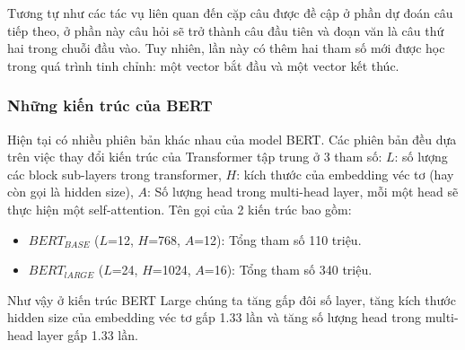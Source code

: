 Tương tự như các tác vụ liên quan đến cặp câu được đề cập ở phần dự đoán câu tiếp theo, ở phần này câu hỏi sẽ trở thành câu đầu tiên và đoạn văn là câu thứ hai trong chuỗi đầu vào. Tuy nhiên, lần này có thêm hai tham số mới được học trong quá trình tinh chỉnh: một vector bắt đầu và một vector kết thúc.

\subsubsection{Những kiến trúc của BERT}
Hiện tại có nhiều phiên bản khác nhau của model BERT. Các phiên bản đều dựa trên việc thay đổi kiến trúc của Transformer tập trung ở 3 tham số: $L$: số lượng các block sub-layers trong transformer, $H$: kích thước của embedding véc tơ (hay còn gọi là hidden size), $A$: Số lượng head trong multi-head layer, mỗi một head sẽ thực hiện một self-attention. Tên gọi của 2 kiến trúc bao gồm:
\begin{itemize}
    \item $BERT_{BASE}$ ($L$=12, $H$=768, $A$=12): Tổng tham số 110 triệu.
    \item $BERT_{lARGE}$ ($L$=24, $H$=1024, $A$=16): Tổng tham số 340 triệu.
\end{itemize}
Như vậy ở kiến trúc BERT Large chúng ta tăng gấp đôi số layer, tăng kích thước hidden size của embedding véc tơ gấp 1.33 lần và tăng số lượng head trong multi-head layer gấp 1.33 lần.

